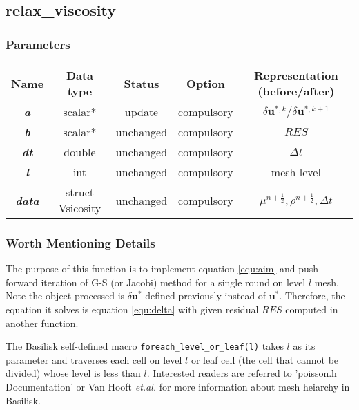 \documentclass[a4paper]{article}
\newcommand{\func}[1]{\textbf{\textcolor{function}{#1}}}
\newcommand{\para}[1]{\textbf{\emph{\textcolor{para}{#1}}}}
\begin{document}
\subsection{\func{relax\_viscosity}}

\subsubsection{Parameters}
\begin{center}
  \begin{tabular}{|c|c|c|c|c|}
    \hline
    Name & Data type & Status & Option & Representation (before/after)\\[0.5ex]
    \hline\hline
    \rowcolor{output} \para{a} & scalar* & update & compulsory & $\delta \mathbf{u}^{*,k}/\delta \mathbf{u}^{*,k+1}$\\
    \hline
    \para{b} & scalar* & unchanged & compulsory & $RES$\\
    \hline
    \para{dt} & double & unchanged & compulsory & $\Delta t$\\
    \hline
    \para{l} & int & unchanged & compulsory &  mesh level \\
    \hline
    \para{data} & struct Vsicosity & unchanged & compulsory & $\mu^ {n+\frac{1}{2}}, \rho^{n+\frac{1}{2}}, \Delta t$ \\
    \hline
  \end{tabular}
\end{center}

\subsubsection{Worth Mentioning Details}
The purpose of this function is to implement equation \ref{equ:aim} and push forward iteration of G-S (or Jacobi) method for a single round on level $l$ mesh. Note the object processed is $\delta \mathbf{u}^{*}$ defined previously instead of $ \mathbf{u}^{*}$. Therefore, the equation it solves is equation \ref{equ:delta} with given residual $RES$ computed in another function.\par 
The Basilisk self-defined macro \texttt{foreach_level_or_leaf(l)} takes $l$ as its parameter and traverses each cell on level $l$ or leaf cell (the cell that cannot be divided) whose level is less than $l$. Interested readers are referred to 'poisson.h Documentation' or Van Hooft \emph{et.al.}\cite{van2018towards} for more information about mesh heiarchy in Basilisk. 
\end{document}
